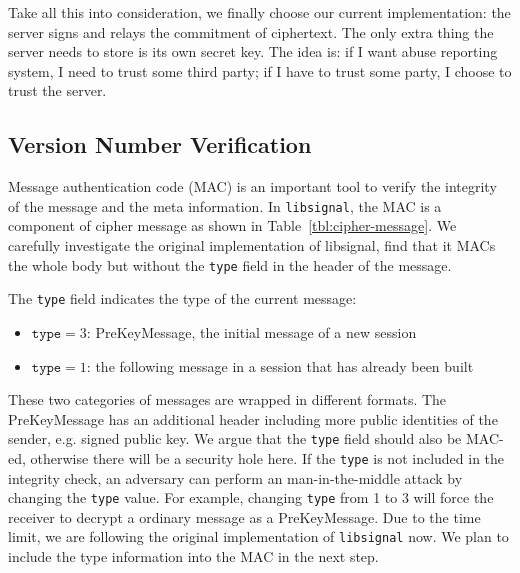 Take all this into consideration, we finally choose our current implementation:
the server signs and relays the commitment of ciphertext.
The only extra thing the server needs to store is its own secret key.
The idea is: if I want abuse reporting system, I need to trust some third party;
if I have to trust some party, I choose to trust the server.

\subsection{Version Number Verification}
\label{sec:version_verify}
Message authentication code (MAC) is an important tool to verify the integrity of the message and the meta information.
In \texttt{libsignal}, the MAC is a component of cipher message as shown in Table~\ref{tbl:cipher-message}.
We carefully investigate the original implementation of libsignal,
find that it MACs the whole body but without the \texttt{type} field in the header of the message.

The \texttt{type} field indicates the type of the current message:
\begin{itemize}
\item $\texttt{type} = 3$: PreKeyMessage, the initial message of a new session
\item $\texttt{type} = 1$: the following message in a session that has already been built 
\end{itemize}
These two categories of messages are wrapped in different formats.
The PreKeyMessage has an additional header including more public identities of the sender,
e.g. signed public key.
We argue that the \texttt{type} field should also be MAC-ed,
otherwise there will be a security hole here.
If the \texttt{type} is not included in the integrity check,
an adversary can perform an man-in-the-middle attack by changing the \texttt{type} value.
For example, changing \texttt{type} from 1 to 3 will force the receiver to decrypt a ordinary message as a PreKeyMessage.
Due to the time limit, we are following the original implementation of \texttt{libsignal} now.
We plan to include the type information into the MAC in the next step.

